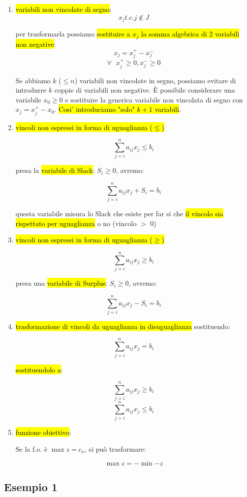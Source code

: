 \begin{enumerate}
	\item \hl{variabili non vincolate di segno}: $$x_j t.c. j \notin J$$

		per trasformarla possiamo \hl{sostituire a $x_j$ la somma algebrica di 2 variabili non negative}: $$x_j = x_j^+ - x_j^-$$ $$\forall\ \ \ x_j^+ \geq 0, x_j^- \geq 0$$

		Se abbiamo $k$ ($\leq n$) variabili non vincolate in segno, possiamo evitare di introdurre $k$ coppie di variabili non negative. È possibile considerare una variabile $x_0 \geq 0$ e sostituire la generica variabile non vincolata di segno con $x_j = x_j^+ - x_0$. \hl{Cosi' introduciamo "solo" $k+1$ variabili}.
	
	\item \hl{vincoli non espressi in forma di uguaglianza ($\leq$)}
		
		$$\sum_{j=i}^n a_{ij} x_j \leq b_i$$
	
		presa la \hl{variabile di Slack}: $S_i \geq 0$, avremo:
	
		$$\sum_{j=i}^n a_{ij} x_j + S_i = b_i$$
	
	
		questa variabile misura lo Slack che esiste per far si che \hl{il vincolo sia rispettato per uguaglianza} o no (vincolo $>$ 0)
		
	\item \hl{vincoli non espressi in forma di uguaglianza ($\geq$)}
	
		$$\sum_{j=i}^n a_{ij} x_j \geq b_i$$
		
		presa una \hl{variabile di Surplus}: $S_i \geq 0$, avremo:
		
		$$\sum_{j=i}^n a_{ij} x_j - S_i = b_i$$
		
	\item \hl{trasformazione di vincoli da uguaglianza in disuguaglianza} sostituendo:

		$$\sum_{j=i}^n a_{ij} x_j = b_i$$
		
		\hl{sostituendolo a}:
		
		$$\sum_{j=i}^n a_{ij} x_j \geq b_i$$
		$$\sum_{j=i}^n a_{ij} x_j \leq b_i$$
		
	\item \hl{funzione obiettivo}:
	
		Se la f.o. è $\max z = c_x$, si può trasformare:
	
		$$\max z = -\min {-z}$$

	
\end{enumerate}


\subsection{Esempio 1}

